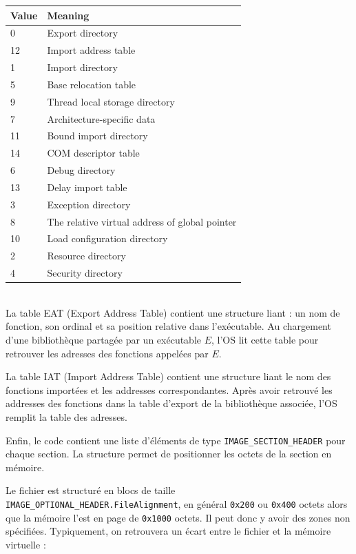 \documentclass{book}
\newenvironment{commentaire}[1]{%
	\def\FrameCommand{\fboxrule=\FrameRule\fboxsep=\FrameSep \fcolorbox{yellow!50}{yellow!10}}%
	\MakeFramed {\advance\hsize-\width \FrameRestore}
	\noindent {\bf #1}\\
}%
{\endMakeFramed}
\newcommand{\code}[1]{\texttt{#1}}
\begin{document}
\bigskip
\begin{tabular}{| l | l |}
	\hline
Value	&Meaning \\
\hline
0 & Export directory\\
12&Import address table\\
1&Import directory \\
5 &Base relocation table\\
9 & Thread local storage directory\\
7 &Architecture-specific data \\
11&Bound import directory\\
14&COM descriptor table\\
6&Debug directory\\
13&Delay import table\\
3 &Exception directory \\
8 & The relative virtual address of global pointer\\
10 &Load configuration directory\\
2 & Resource directory \\
4& Security directory \\
\hline
\end{tabular}


\begin{commentaire}{En bref}
La table EAT (Export Address Table) contient une structure liant : un nom de fonction, son ordinal et sa position relative dans l'exécutable. Au chargement d'une bibliothèque partagée par un exécutable $E$, l'OS lit cette table pour retrouver les adresses des fonctions appelées par $E$.


La table IAT (Import Address Table) contient une structure liant le nom des fonctions importées et les addresses correspondantes. Après avoir retrouvé les addresses des fonctions dans la table d'export de la bibliothèque associée, l'OS remplit la table des adresses.  
\end{commentaire}

Enfin, le code contient une liste d'éléments de type \code{IMAGE\_SECTION\_HEADER} pour chaque section. La structure permet de positionner les octets de la section en mémoire. 


Le fichier est structuré en blocs de taille \code{IMAGE\_OPTIONAL\_HEADER.FileAlignment}, en général \code{0x200} ou \code{0x400} octets alors que la mémoire l'est en page de \code{0x1000} octets. Il peut donc y avoir des zones non spécifiées. Typiquement, on retrouvera un écart entre le fichier et la mémoire virtuelle : 
\end{document}
